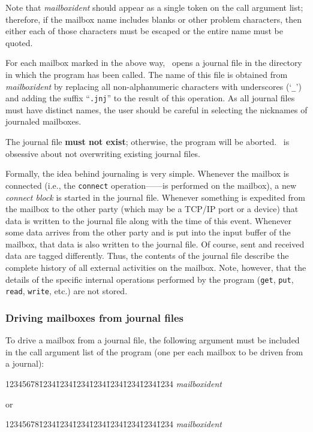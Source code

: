 Note that {\em mailboxident\/} should appear as a single token on the call
argument list; therefore, if the mailbox name includes blanks or other
problem characters, then either each of those characters must be escaped or
the entire name must be quoted.

For each mailbox marked in the above way, \smurph\ opens a journal file
in the directory in which the program has been called.
The name of this file is obtained from {\em mailboxident\/} by replacing
all non-alphanumeric characters with underscores (`{\tt \_}') and adding
the suffix ``{\tt .jnj}'' to the result of this operation.
As all journal files must have distinct names, the user should be careful
in selecting the nicknames of journaled mailboxes.

The journal file {\bf must not exist}; otherwise,
the program will be aborted.
\smurph\ is obsessive about not overwriting existing journal files.

Formally, the idea behind journaling is very simple.
Whenever the mailbox is connected (i.e., the {\tt connect}
operation------is performed on the mailbox), a new
{\em connect block\/} is started in the journal file.
Whenever something is expedited from the mailbox to the other party
(which may be a TCP/IP port or a device) that data is written
to the journal file along with the time of this event.
Whenever some data arrives from the other party and is put into the
input buffer of the mailbox, that data is also written to the journal
file.
Of course, sent and received data are tagged differently.
Thus, the contents of the journal file describe the complete history of
all external activities on the mailbox.
Note, however, that the details of the specific internal
operations performed by the
program ({\tt get}, {\tt put}, {\tt read}, {\tt write}, etc.) are not
stored.

\subsubsection{Driving mailboxes from journal files}
\label{rm_mb_ju_dj}

To drive a mailbox from a journal file, the following argument must be
included in the call argument list of the program (one per each mailbox
to be driven from a journal):
{\tt\begin{tabbing}
12345678\=1234\=1234\=1234\=1234\=1234\=1234\=1234\=1234\kill
{} {\em mailboxident\/}
\end{tabbing}}
or
{\tt\begin{tabbing}
12345678\=1234\=1234\=1234\=1234\=1234\=1234\=1234\=1234\kill
{} {\em mailboxident\/}
\end{tabbing}}

